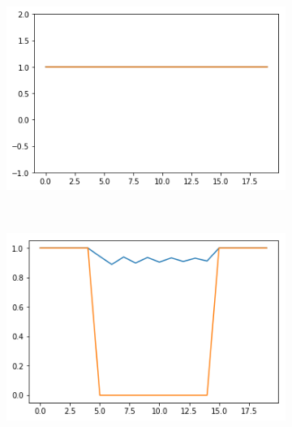 \documentclass[12pt, letterpaper]{article}
\begin{document}
\begin{figure}[h]
    \centering
    \begin{subfigure}[b]{0.3\textwidth}
        \includegraphics[width=\textwidth]{of_c1}
        \label{fig:gull}
    \end{subfigure}
    ~ %
    \begin{subfigure}[b]{0.3\textwidth}
        \includegraphics[width=\textwidth]{of_c2}
        \label{fig:tiger}
    \end{subfigure}
    ~ %
    \begin{subfigure}[b]{0.3\textwidth}

\end{subfigure}
\end{figure}
\end{document}
